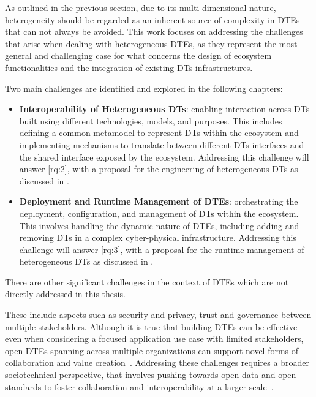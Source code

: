 As outlined in the previous section, due to its multi-dimensional nature, heterogeneity should be regarded as an inherent source of complexity in \acp{DTE} that can not always be avoided.
%
This work focuses on addressing the challenges that arise when dealing with heterogeneous \acp{DTE}, as they represent the most general and challenging case for what concerns the design of ecosystem functionalities and the integration of existing \acp{DT} infrastructures.

Two main challenges are identified and explored in the following chapters:

\begin{itemize}
    \item \textbf{Interoperability of Heterogeneous \aclp{DT}}: enabling interaction across \acp{DT} built using different technologies, models, and purposes. This includes defining a common metamodel to represent \acp{DT} within the ecosystem and implementing mechanisms to translate between different \acp{DT} interfaces and the shared interface exposed by the ecosystem.
    Addressing this challenge will answer \ref{rq:2}, with a proposal for the engineering of heterogeneous \acp{DT} as discussed in .

    \item \textbf{Deployment and Runtime Management of \aclp{DTE}}: orchestrating the deployment, configuration, and management of \acp{DT} within the ecosystem. This involves handling the dynamic nature of \acp{DTE}, including adding and removing \acp{DT} in a complex cyber-physical infrastructure. Addressing this challenge will answer \ref{rq:3}, with a proposal for the runtime management of heterogeneous \acp{DT} as discussed in .
\end{itemize}

There are other significant challenges in the context of \acp{DTE} which are not directly addressed in this thesis.

These include aspects such as security and privacy, trust and governance between multiple stakeholders.
%
Although it is true that building \acp{DTE} can be effective even when considering a focused application use case with limited stakeholders, open \acp{DTE} spanning across multiple organizations can support novel forms of collaboration and value creation~\cite{kendall2021ndt}.
%
Addressing these challenges requires a broader sociotechnical perspective, that involves pushing towards open data and open standards to foster collaboration and interoperability at a larger scale~\cite{Acharya_Khan_Päivärinta_2024}.

